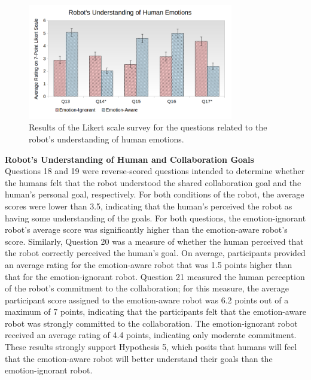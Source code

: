 \documentclass[12pt]{report}
\begin{document}
\begin{figure}[tbh]
\centering
\includegraphics[width=0.8\textwidth]{figure/Overall-Emotions.png}
\vspace*{-5mm}
\caption{Results of the Likert scale survey for the questions related to the
robot's understanding of human emotions.}
\label{fig:overall-emotions}
\end{figure}

\hspace*{-8mm} \textbf{Robot's Understanding of Human and Collaboration Goals}
\label{sec:Goals}
\\Questions 18 and 19 were reverse-scored questions intended to determine
whether the humans felt that the robot understood the shared collaboration goal and the
human's personal goal, respectively. For both conditions of the robot, the
average scores were lower than 3.5, indicating that the human's perceived the
robot as having some understanding of the goals. For both questions, the
emotion-ignorant robot's average score was significantly higher than the
emotion-aware robot's score. Similarly, Question 20 was a measure of whether the
human perceived that the robot correctly perceived the human's goal.
On average, participants provided an average rating for the emotion-aware robot
that was 1.5 points higher than that for the emotion-ignorant robot. Question 21
measured the human perception of the robot's commitment to the collaboration;
for this measure, the average participant score assigned to the emotion-aware
robot was 6.2 points out of a maximum of 7 points, indicating that the
participants felt that the emotion-aware robot was strongly committed to the
collaboration. The emotion-ignorant robot received an average rating of 4.4
points, indicating only moderate commitment. These results strongly support
Hypothesis 5, which posits that humans will feel that the emotion-aware robot
will better understand their goals than the emotion-ignorant robot.\\
\end{document}
